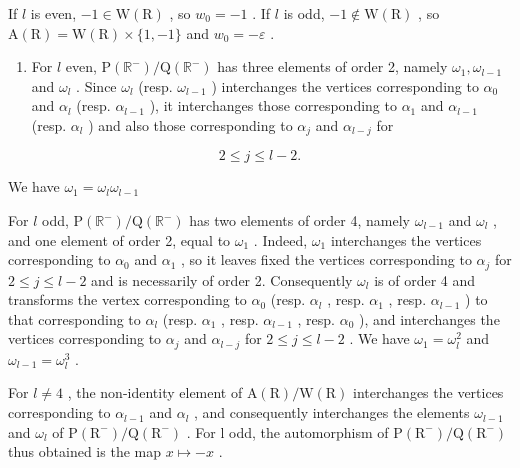 If \(l\) is even, \(-1 \in \mathrm{W}(\mathrm{R})\) , so \(w_0 = -1\) . If \(l\) is odd, \(-1 \notin \mathrm{W}(\mathrm{R})\) , so \(\mathrm{A}(\mathrm{R}) = \mathrm{W}(\mathrm{R}) \times \{1, -1\}\) and \(w_0 = -\varepsilon\) .

\begin{enumerate}
\def\labelenumi{(\Roman{enumi})}
\setcounter{enumi}{11}
\tightlist
\item
  For \(l\) even, \(\mathrm{P}(\mathbb{R}^{-}) / \mathrm{Q}(\mathbb{R}^{-})\) has three elements of order 2, namely \(\omega_{1}, \omega_{l-1}\) and \(\omega_{l}\) . Since \(\omega_{l}\) (resp. \(\omega_{l-1}\) ) interchanges the vertices corresponding to \(\alpha_{0}\) and \(\alpha_{l}\) (resp. \(\alpha_{l-1}\) ), it interchanges those corresponding to \(\alpha_{1}\) and \(\alpha_{l-1}\) (resp. \(\alpha_{l}\) ) and also those corresponding to \(\alpha_{j}\) and \(\alpha_{l-j}\) for
\end{enumerate}

\[
2 \leqslant j \leqslant l - 2.
\]

We have \(\omega_{1} = \omega_{l}\omega_{l - 1}\)

For \(l\) odd, \(\mathrm{P}(\mathbb{R}^{-}) / \mathrm{Q}(\mathbb{R}^{-})\) has two elements of order 4, namely \(\omega_{l-1}\) and \(\omega_l\) , and one element of order 2, equal to \(\omega_1\) . Indeed, \(\omega_1\) interchanges the vertices corresponding to \(\alpha_0\) and \(\alpha_1\) , so it leaves fixed the vertices corresponding to \(\alpha_j\) for \(2 \leqslant j \leqslant l-2\) and is necessarily of order 2. Consequently \(\omega_l\) is of order 4 and transforms the vertex corresponding to \(\alpha_0\) (resp. \(\alpha_l\) , resp. \(\alpha_1\) , resp. \(\alpha_{l-1}\) ) to that corresponding to \(\alpha_l\) (resp. \(\alpha_1\) , resp. \(\alpha_{l-1}\) , resp. \(\alpha_0\) ), and interchanges the vertices corresponding to \(\alpha_j\) and \(\alpha_{l-j}\) for \(2 \leqslant j \leqslant l-2\) . We have \(\omega_1 = \omega_l^2\) and \(\omega_{l-1} = \omega_l^3\) .

For \(l \neq 4\) , the non-identity element of \(\mathrm{A}(\mathrm{R})/\mathrm{W}(\mathrm{R})\) interchanges the vertices corresponding to \(\alpha_{l-1}\) and \(\alpha_{l}\) , and consequently interchanges the elements \(\omega_{l-1}\) and \(\omega_{l}\) of \(\mathrm{P}(\mathrm{R}^{-})/\mathrm{Q}(\mathrm{R}^{-})\) . For l odd, the automorphism of \(\mathrm{P}(\mathrm{R}^{-})/\mathrm{Q}(\mathrm{R}^{-})\) thus obtained is the map \(x \mapsto -x\) .

